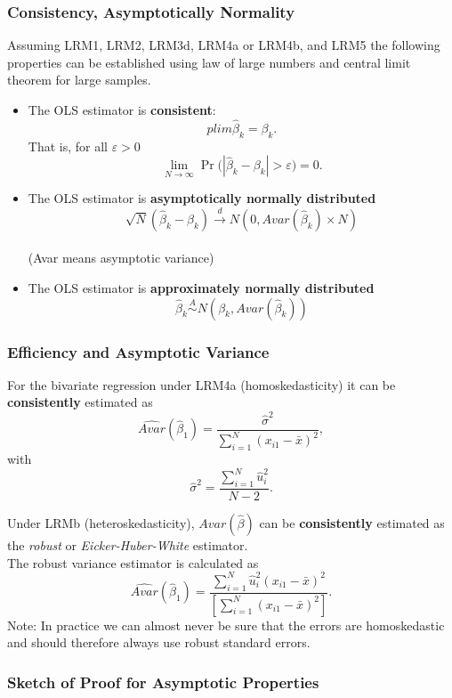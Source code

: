 \documentclass[a4paper,12pt]{article}
\def\emph{\textit}
\begin{document}
\subsubsection*{Consistency, Asymptotically Normality}


Assuming LRM1,  LRM2,  LRM3d,  LRM4a or LRM4b,  and LRM5 the following properties can be established using law of large numbers and central limit theorem for large samples.
\begin{itemize}
\item The OLS estimator is \textbf{consistent}:\\
$$plim \hat{\beta}_k = \beta_k.$$
That is, for all $\varepsilon > 0$ $$\lim_{N\to\infty}\Pr\big(|\hat{\beta}_k-\beta_k| > \varepsilon\big) = 0.$$
\item The OLS estimator is \textbf{asymptotically normally distributed}
$$\sqrt{N} (\hat{\beta}_k-\beta_k) \overset{d}{\rightarrow} N(0,Avar(\hat{\beta}_k)\times N)$$\\(Avar means asymptotic variance)
\item The OLS estimator is \textbf{approximately normally distributed}
$$\hat{\beta}_k\overset{A}{\sim}N\left(\beta_k, Avar(\hat{\beta}_k)\right)$$
								
\end{itemize}



\subsubsection*{Efficiency and Asymptotic Variance}


For the bivariate regression under LRM4a (homoskedasticity) it can be \textbf{consistently} estimated as
$$\widehat{Avar}(\hat{\beta}_1)=\frac{\hat{\sigma}^2}{\sum^{N}_{i=1}{(x_{i1}-\bar{x})^2}},$$
with
$$\hat{\sigma}^2=\frac{\sum^{N}_{i=1}{\hat{u}^2_i}}{N-2}.$$

Under LRMb (heteroskedasticity), $Avar(\hat{\beta})$ can be \textbf{consistently} estimated as the \emph{robust} or \emph{Eicker-Huber-White} estimator.\\[2ex] The robust variance estimator is calculated as
$$\widehat{Avar}(\hat{\beta}_1)=\frac{\sum^{N}_{i=1}{\hat{u}^2_i(x_{i1}-\bar{x})^2}}{\left[\sum^{N}_{i=1}{(x_{i1}-\bar{x})^2}\right]}.$$
Note: In practice we can almost never be sure that the errors are homoskedastic and should therefore always use robust standard errors.




\subsubsection*{Sketch of Proof for Asymptotic Properties}
\end{document}
